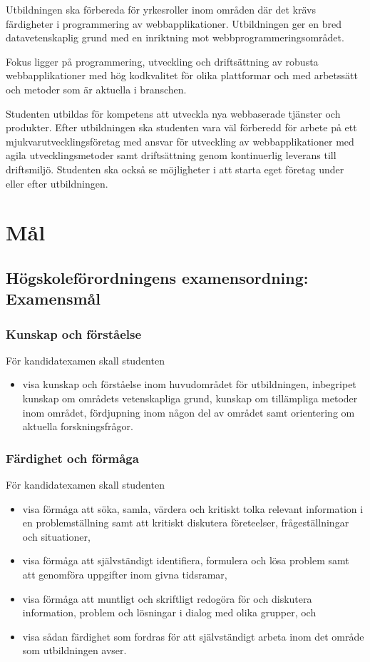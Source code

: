 \documentclass[swedish]{LnuCmThesis}
\begin{document}
Utbildningen ska förbereda för yrkesroller inom områden där det krävs färdigheter i programmering av webbapplikationer. Utbildningen ger en bred datavetenskaplig grund med en inriktning mot webbprogrammeringsområdet.

Fokus ligger på programmering, utveckling och driftsättning av robusta webbapplikationer med hög kodkvalitet för olika plattformar och med arbetssätt och metoder som är aktuella i branschen. 

Studenten utbildas för kompetens att utveckla nya webbaserade tjänster och produkter. Efter utbildningen ska studenten vara väl förberedd för arbete på ett mjukvarutvecklingsföretag med ansvar för utveckling av webbapplikationer med agila utvecklingsmetoder samt driftsättning genom kontinuerlig leverans till driftsmiljö. Studenten ska också se möjligheter i att starta eget företag under eller efter utbildningen. 

\section*{Mål}

\subsection*{Högskoleförordningens examensordning: Examensmål}

\subsubsection*{Kunskap och förståelse}

För kandidatexamen skall studenten

\begin{itemize}
    \item visa kunskap och förståelse inom huvudområdet för utbildningen, inbegripet kunskap om områdets vetenskapliga grund, kunskap om tillämpliga metoder inom området, fördjupning inom någon del av området samt orientering om aktuella forskningsfrågor.
\end{itemize}

\subsubsection*{Färdighet och förmåga}

För kandidatexamen skall studenten

\begin{itemize}
    \item visa förmåga att söka, samla, värdera och kritiskt tolka relevant information i en problemställning samt att kritiskt diskutera företeelser, frågeställningar och situationer,
    \item visa förmåga att självständigt identifiera, formulera och lösa problem samt att genomföra uppgifter inom givna tidsramar,
    \item visa förmåga att muntligt och skriftligt redogöra för och diskutera information, problem och lösningar i dialog med olika grupper, och
    \item visa sådan färdighet som fordras för att självständigt arbeta inom det område som utbildningen avser.
\end{itemize}
\end{document}
